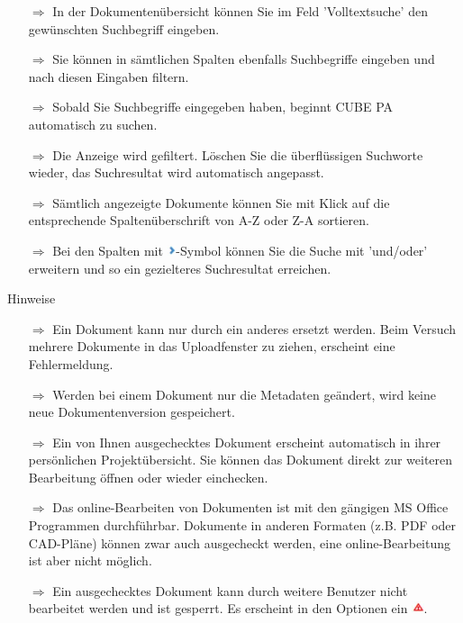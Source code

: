 \documentclass{article}
\begin{document}
\begin{multicols}{2}
\begin{tcolorbox}[colback=blue!5,colframe=blue!40!black,title=Finden von Dokumenten]
\begin{itemize}
  \item[$\Longrightarrow$] In der Dokumentenübersicht können Sie im Feld 'Volltextsuche' den gewünschten Suchbegriff eingeben.
  \item[$\Longrightarrow$] Sie können in sämtlichen Spalten ebenfalls Suchbegriffe eingeben und nach diesen Eingaben filtern.
  \item[$\Longrightarrow$] Sobald Sie Suchbegriffe eingegeben haben, beginnt CUBE PA automatisch zu suchen.
	\item[$\Longrightarrow$] Die Anzeige wird gefiltert. Löschen Sie die überflüssigen Suchworte wieder, das Suchresultat wird automatisch angepasst.
	\item[$\Longrightarrow$] Sämtlich angezeigte Dokumente können Sie mit Klick auf die entsprechende Spaltenüberschrift von A-Z oder Z-A sortieren.
	\item[$\Longrightarrow$] Bei den Spalten mit \includegraphics[height=9pt]{Icons/Pfeil_rechts.jpg}-Symbol können Sie die Suche mit 'und/oder' erweitern und so ein gezielteres Suchresultat erreichen.
\end{itemize}
\end{tcolorbox}


\end{multicols}



\begin{beamerlikethm}{Hinweise}
\begin{itemize}
  \item[$\Longrightarrow$] Ein Dokument kann nur durch ein anderes ersetzt werden. Beim Versuch mehrere Dokumente in das Uploadfenster zu ziehen, erscheint eine Fehlermeldung.
 \item[$\Longrightarrow$] Werden bei einem Dokument nur die Metadaten geändert, wird keine neue Dokumentenversion gespeichert.
 \item[$\Longrightarrow$] Ein von Ihnen ausgechecktes Dokument erscheint automatisch in ihrer persönlichen Projektübersicht. Sie können das Dokument direkt zur weiteren Bearbeitung öffnen oder wieder einchecken.
 \item[$\Longrightarrow$] Das online-Bearbeiten von Dokumenten ist mit den gängigen MS Office Programmen durchführbar. Dokumente in anderen Formaten (z.B. PDF oder CAD-Pläne) können
zwar auch ausgecheckt werden, eine online-Bearbeitung ist aber nicht möglich.
 \item[$\Longrightarrow$] Ein ausgechecktes Dokument kann durch weitere Benutzer nicht bearbeitet werden und ist gesperrt. Es erscheint in den Optionen ein \includegraphics[height=10pt]{Icons/Warnung_rot.jpg}.
\end{itemize}
\end{beamerlikethm}
\end{document}
